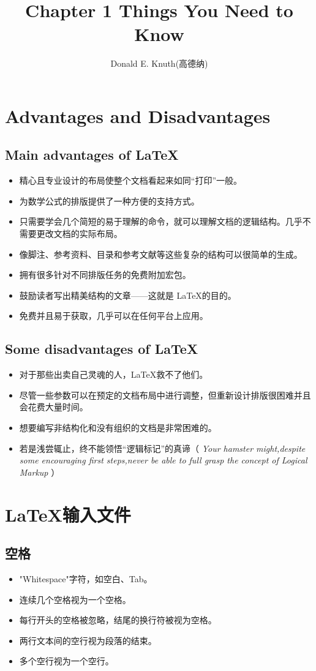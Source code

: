 \documentclass[UTF8]{ctexart}
\title{\heiti Chapter 1 Things You Need to Know}
\author{ Donald E. Knuth(高德纳)}
\begin{document}
\maketitle

\tableofcontents

\newpage
\section{Advantages and Disadvantages}
\subsection{Main advantages of \LaTeX}
\begin{itemize}
  \item 精心且专业设计的布局使整个文档看起来如同“打印”一般。
  \item 为数学公式的排版提供了一种方便的支持方式。
  \item 只需要学会几个简短的易于理解的命令，就可以理解文档的逻辑结构。几乎不需要更改文档的实际布局。
  \item 像脚注、参考资料、目录和参考文献等这些复杂的结构可以很简单的生成。
  \item 拥有很多针对不同排版任务的免费附加宏包。
  \item 鼓励读者写出精美结构的文章——这就是 \LaTeX 的目的。
  \item 免费并且易于获取，几乎可以在任何平台上应用。
\end{itemize}
\subsection{Some disadvantages of \LaTeX}
\begin{itemize}
  \item 对于那些出卖自己灵魂的人，\LaTeX 救不了他们。
  \item 尽管一些参数可以在预定的文档布局中进行调整，但重新设计排版很困难并且会花费大量时间。
  \item 想要编写非结构化和没有组织的文档是非常困难的。
  \item 若是浅尝辄止，终不能领悟“逻辑标记”的真谛（\emph{ Your hamster might,despite some encouraging first steps,never be able to full grasp the concept of Logical Markup } ）
\end{itemize}

\section{\LaTeX 输入文件}
\subsection{空格}
\begin{itemize}
  \item "Whitespace"字符，如空白、Tab。
  \item 连续几个空格视为一个空格。
  \item 每行开头的空格被忽略，结尾的换行符被视为空格。
  \item 两行文本间的空行视为段落的结束。
  \item 多个空行视为一个空行。
\end{itemize}
\end{document}
